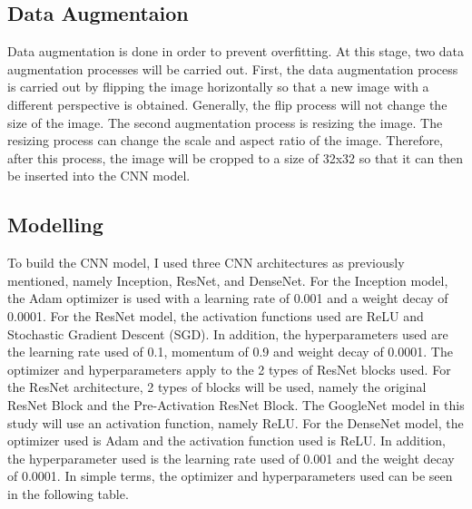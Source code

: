 \documentclass[peerreview]{IEEEtran}
\begin{document}
\subsection{Data Augmentaion}
Data augmentation is done in order to prevent overfitting. At this stage, two data augmentation processes will be carried out. First, the data augmentation process is carried out by flipping the image horizontally so that a new image with a different perspective is obtained. Generally, the flip process will not change the size of the image. The second augmentation process is resizing the image. The resizing process can change the scale and aspect ratio of the image. Therefore, after this process, the image will be cropped to a size of 32x32 so that it can then be inserted into the CNN model.

\subsection{Modelling}
To build the CNN model, I used three CNN architectures as previously mentioned, namely Inception, ResNet, and DenseNet. For the Inception model, the Adam optimizer is used with a learning rate of 0.001 and a weight decay of 0.0001. For the ResNet model, the activation functions used are ReLU and Stochastic Gradient Descent (SGD). In addition, the hyperparameters used are the learning rate used of 0.1, momentum of 0.9 and weight decay of 0.0001. The optimizer and hyperparameters apply to the 2 types of ResNet blocks used. For the ResNet architecture, 2 types of blocks will be used, namely the original ResNet Block and the Pre-Activation ResNet Block. The GoogleNet model in this study will use an activation function, namely ReLU. For the DenseNet model, the optimizer used is Adam and the activation function used is ReLU. In addition, the hyperparameter used is the learning rate used of 0.001 and the weight decay of 0.0001. In simple terms, the optimizer and hyperparameters used can be seen in the following table.
\end{document}
